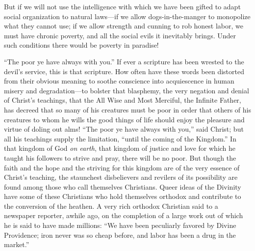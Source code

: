 \documentclass{book}
\begin{document}
But if we will not use the intelligence with which we have been gifted to adapt social organization to natural laws—if we allow dogs-in-the-manger to monopolize what they cannot use; if we allow strength and cunning to rob honest labor, we must have chronic poverty, and all the social evils it inevitably brings. Under such conditions there would be poverty in paradise!

“The poor ye have always with you.” If ever a scripture has been wrested to the devil’s service, this is that scripture. How often have these words been distorted from their obvious meaning to soothe conscience into acquiescence in human misery and degradation—to bolster that blasphemy, the very negation and denial of Christ’s teachings, that the All Wise and Most Merciful, the Infinite Father, has decreed that so many of his creatures must be poor in order that others of his creatures to whom he wills the good things of life should enjoy the pleasure and virtue of doling out alms! “The poor ye have always with you,” said Christ; but all his teachings supply the limitation, “until the coming of the Kingdom.” In that kingdom of God \emph{on earth}, that kingdom of justice and love for which he taught his followers to strive and pray, there will be no poor. But though the faith and the hope and the striving for this kingdom are of the very essence of Christ’s teaching, the staunchest disbelievers and revilers of its possibility are found among those who call themselves Christians. Queer ideas of the Divinity have some of these Christians who hold themselves orthodox and contribute to the conversion of the heathen. A very rich orthodox Christian said to a newspaper reporter, awhile ago, on the completion of a large work out of which he is said to have made millions: “We have been peculiarly favored by Divine Providence; iron never was so cheap before, and labor has been a drug in the market.”
\end{document}
